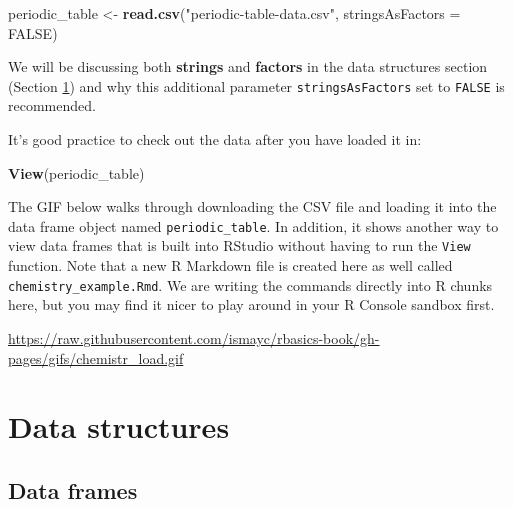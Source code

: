 \documentclass[]{tufte-book}
\newenvironment{Shaded}{\begin{snugshade}}{\end{snugshade}}
\newcommand{\KeywordTok}[1]{\textcolor[rgb]{0.13,0.29,0.53}{\textbf{{#1}}}}
\newcommand{\DataTypeTok}[1]{\textcolor[rgb]{0.13,0.29,0.53}{{#1}}}
\newcommand{\StringTok}[1]{\textcolor[rgb]{0.31,0.60,0.02}{{#1}}}
\newcommand{\OtherTok}[1]{\textcolor[rgb]{0.56,0.35,0.01}{{#1}}}
\newcommand{\NormalTok}[1]{{#1}}
\begin{document}
\begin{Shaded}
\begin{Highlighting}[]
\NormalTok{periodic_table <-}\StringTok{ }\KeywordTok{read.csv}\NormalTok{(}\StringTok{"periodic-table-data.csv"}\NormalTok{,}
                           \DataTypeTok{stringsAsFactors =} \OtherTok{FALSE}\NormalTok{)}
\end{Highlighting}
\end{Shaded}

We will be discussing both \textbf{strings} and \textbf{factors} in the
data structures section (Section \ref{data-structures}) and why this
additional parameter \texttt{stringsAsFactors} set to \texttt{FALSE} is
recommended.

It's good practice to check out the data after you have loaded it in:

\begin{Shaded}
\begin{Highlighting}[]
\KeywordTok{View}\NormalTok{(periodic_table)}
\end{Highlighting}
\end{Shaded}

The GIF below walks through downloading the CSV file and loading it into
the data frame object named \texttt{periodic\_table}. In addition, it
shows another way to view data frames that is built into RStudio without
having to run the \texttt{View} function. Note that a new R Markdown
file is created here as well called \texttt{chemistry\_example.Rmd}. We
are writing the commands directly into R chunks here, but you may find
it nicer to play around in your R Console sandbox first.

\vspace{0.1in}

\begin{center}\footnotesize{\url{https://raw.githubusercontent.com/ismayc/rbasics-book/gh-pages/gifs/chemistr_load.gif}}\end{center}

\vspace{0.1in}

\section{Data structures}\label{data-structures}

\subsection{Data frames}\label{data-frames}
\end{document}
